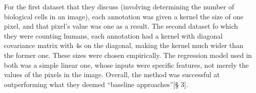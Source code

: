 For the first dataset that they discuss (involving determining the number of biological cells in an
image), each annotation was given a kernel the size of one pixel, and that pixel's value was one as
a result. The second dataset fo which they were counting humans, each annotation had a kernel with
diagonal covariance matrix with 4s on the diagonal, making the kernel much wider than the former
one. These sizes were chosen empirically. The regression model used in both was a simple linear one, whose
inputs were specific features, not merely the values of the pixels in the image. Overall, the method
was successful at outperforming what they deemed ``baseline approaches''\cite{learningtocount}[§ 3].